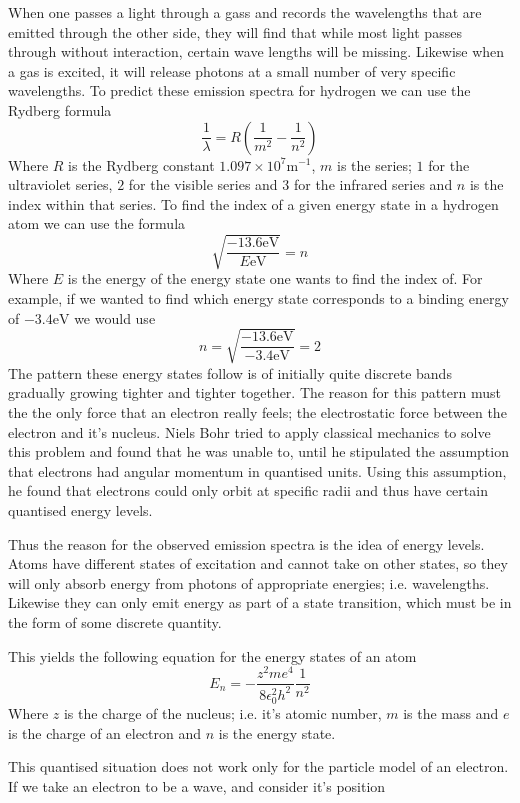 \documentclass[12pt]{report}
\begin{document}
\begin{flushleft}
When one passes a light through a gass and records the wavelengths that are
emitted through the other side, they will find that while most light passes
through without interaction, certain wave lengths will be missing. Likewise
when a gas is excited, it will release photons at a small number of very
specific wavelengths. To predict these emission spectra for hydrogen we can
use the Rydberg formula
\[\frac{1}{\lambda} = R\left(\frac{1}{m^2} - \frac{1}{n^2}\right)\]
Where \(R\) is the Rydberg constant \(1.097\times10^7\mathrm{m}^{-1}\), \(m\)
is the series; \(1\) for the ultraviolet series, \(2\) for the visible series
and \(3\) for the infrared series and \(n\) is the index within that series.
To find the index of a given energy state in a hydrogen atom we can use the
formula
\[\sqrt{\frac{-13.6\mathrm{eV}}{E\mathrm{eV}}} = n\]
Where \(E\) is the energy of the energy state one wants to find the index of.
For example, if we wanted to find which energy state corresponds to a binding
energy of \(-3.4\mathrm{eV}\) we would use
\[n = \sqrt{\frac{-13.6\mathrm{eV}}{-3.4\mathrm{eV}}} = 2\]
The pattern these energy states follow is of initially quite discrete bands
gradually growing tighter and tighter together.
The reason for this pattern must the the only force that an electron really
feels; the electrostatic force between the electron and it's nucleus. Niels
Bohr tried to apply classical mechanics to solve this problem and found that
he was unable to, until he stipulated the assumption that electrons had angular
momentum in quantised units. Using this assumption, he found that electrons
could only orbit at specific radii and thus have certain quantised energy
levels. \par
Thus the reason for the observed emission spectra is the idea of energy levels.
Atoms have different states of excitation and cannot take on other states, so
they will only absorb energy from photons of appropriate energies; i.e.
wavelengths. Likewise they can only emit energy as part of a state transition,
which must be in the form of some discrete quantity. \par
This yields the following equation for the energy states of an atom
\[E_n = -\frac{z^2me^4}{8\epsilon_0^2h^2}\frac{1}{n^2}\]
Where \(z\) is the charge of the nucleus; i.e. it's atomic number, \(m\) is
the mass and \(e\) is the charge of an electron and \(n\) is the energy state.
\par
This quantised situation does not work only for the particle model of an
electron. If we take an electron to be a wave, and consider it's position

\end{flushleft}
\end{document}
